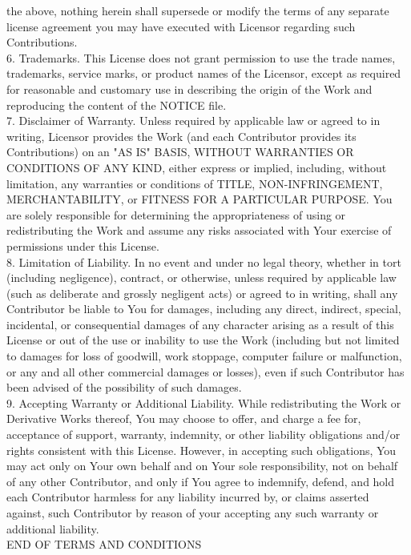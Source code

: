 {the above, nothing herein shall supersede or modify the terms of any
separate license agreement you may have executed with Licensor
regarding such Contributions.
\\[4pt]
6. Trademarks. This License does not grant permission to use the trade
names, trademarks, service marks, or product names of the Licensor,
except as required for reasonable and customary use in describing the
origin of the Work and reproducing the content of the NOTICE file.
\\[4pt]
7. Disclaimer of Warranty. Unless required by applicable law or agreed
to in writing, Licensor provides the Work (and each Contributor
provides its Contributions) on an "AS IS" BASIS, WITHOUT WARRANTIES OR
CONDITIONS OF ANY KIND, either express or implied, including, without
limitation, any warranties or conditions of TITLE, NON-INFRINGEMENT,
MERCHANTABILITY, or FITNESS FOR A PARTICULAR PURPOSE. You are solely
responsible for determining the appropriateness of using or
redistributing the Work and assume any risks associated with Your
exercise of permissions under this License.
\\[4pt]
8. Limitation of Liability. In no event and under no legal theory,
whether in tort (including negligence), contract, or otherwise, unless
required by applicable law (such as deliberate and grossly negligent
acts) or agreed to in writing, shall any Contributor be liable to You
for damages, including any direct, indirect, special, incidental, or
consequential damages of any character arising as a result of this
License or out of the use or inability to use the Work (including but
not limited to damages for loss of goodwill, work stoppage, computer
failure or malfunction, or any and all other commercial damages or
losses), even if such Contributor has been advised of the possibility
of such damages.
\\[4pt]
9. Accepting Warranty or Additional Liability. While redistributing
the Work or Derivative Works thereof, You may choose to offer, and
charge a fee for, acceptance of support, warranty, indemnity, or other
liability obligations and/or rights consistent with this
License. However, in accepting such obligations, You may act only on
Your own behalf and on Your sole responsibility, not on behalf of any
other Contributor, and only if You agree to indemnify, defend, and
hold each Contributor harmless for any liability incurred by, or
claims asserted against, such Contributor by reason of your accepting
any such warranty or additional liability.
\\[4pt]
END OF TERMS AND CONDITIONS
}



